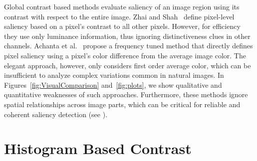 \documentclass[final]{cvpr}
\begin{document}
Global contrast based methods evaluate saliency of an image region using its contrast
with respect to the entire image.
%
Zhai and Shah~\cite{06acmmm/ZhaiS_spatiotemporal} define pixel-level saliency based on a pixel's contrast to all other pixels.
However, for efficiency they use only luminance information, thus ignoring distinctiveness clues in other channels.
%
Achanta et al.~\cite{09cvpr/Achanta_FTSaliency} propose a frequency tuned method that
directly defines pixel saliency using a pixel's color difference from the average image
color. The elegant approach, however, only considers first order average color, which
can be insufficient to analyze complex variations common in natural images.
%
In Figures~\ref{fig:VisualComparison} and~\ref{fig:plots}, we show qualitative and
quantitative weaknesses of such approaches. Furthermore, these methods ignore spatial
relationships across image parts, which can be critical for reliable and coherent
saliency detection (see ).


\section{Histogram Based Contrast}\label{sec:HC}
\end{document}
